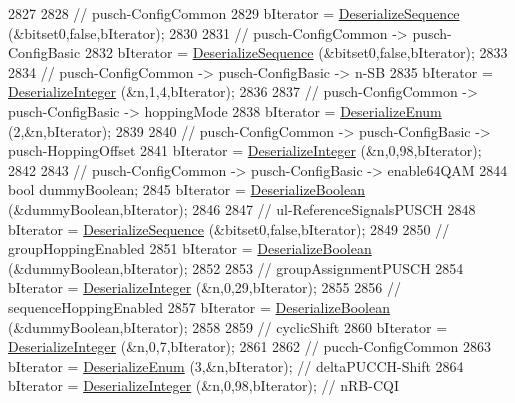 \begin{DoxyCode}
2827 
2828   \textcolor{comment}{// pusch-ConfigCommon}
2829   bIterator = \hyperlink{classns3_1_1Asn1Header_a58c68bb97ba3fe2e8fcdd7c208d672b2}{DeserializeSequence} (&bitset0,\textcolor{keyword}{false},bIterator);
2830 
2831   \textcolor{comment}{// pusch-ConfigCommon -> pusch-ConfigBasic}
2832   bIterator = \hyperlink{classns3_1_1Asn1Header_a58c68bb97ba3fe2e8fcdd7c208d672b2}{DeserializeSequence} (&bitset0,\textcolor{keyword}{false},bIterator);
2833 
2834   \textcolor{comment}{// pusch-ConfigCommon -> pusch-ConfigBasic -> n-SB}
2835   bIterator = \hyperlink{classns3_1_1Asn1Header_a49802c9af30018b078150e866b6ecae2}{DeserializeInteger} (&n,1,4,bIterator);
2836 
2837   \textcolor{comment}{// pusch-ConfigCommon -> pusch-ConfigBasic -> hoppingMode}
2838   bIterator = \hyperlink{classns3_1_1Asn1Header_a4fcc253e0eec3483c775b005c1875f2d}{DeserializeEnum} (2,&n,bIterator);
2839 
2840   \textcolor{comment}{// pusch-ConfigCommon -> pusch-ConfigBasic -> pusch-HoppingOffset}
2841   bIterator = \hyperlink{classns3_1_1Asn1Header_a49802c9af30018b078150e866b6ecae2}{DeserializeInteger} (&n,0,98,bIterator);
2842 
2843   \textcolor{comment}{// pusch-ConfigCommon -> pusch-ConfigBasic -> enable64QAM}
2844   \textcolor{keywordtype}{bool} dummyBoolean;
2845   bIterator = \hyperlink{classns3_1_1Asn1Header_ab46f4b86988a0fbeb5df11a9bc46222d}{DeserializeBoolean} (&dummyBoolean,bIterator);
2846 
2847   \textcolor{comment}{// ul-ReferenceSignalsPUSCH }
2848   bIterator = \hyperlink{classns3_1_1Asn1Header_a58c68bb97ba3fe2e8fcdd7c208d672b2}{DeserializeSequence} (&bitset0,\textcolor{keyword}{false},bIterator);
2849 
2850   \textcolor{comment}{// groupHoppingEnabled }
2851   bIterator = \hyperlink{classns3_1_1Asn1Header_ab46f4b86988a0fbeb5df11a9bc46222d}{DeserializeBoolean} (&dummyBoolean,bIterator);
2852 
2853   \textcolor{comment}{// groupAssignmentPUSCH }
2854   bIterator = \hyperlink{classns3_1_1Asn1Header_a49802c9af30018b078150e866b6ecae2}{DeserializeInteger} (&n,0,29,bIterator);
2855 
2856   \textcolor{comment}{// sequenceHoppingEnabled }
2857   bIterator = \hyperlink{classns3_1_1Asn1Header_ab46f4b86988a0fbeb5df11a9bc46222d}{DeserializeBoolean} (&dummyBoolean,bIterator);
2858 
2859   \textcolor{comment}{// cyclicShift }
2860   bIterator = \hyperlink{classns3_1_1Asn1Header_a49802c9af30018b078150e866b6ecae2}{DeserializeInteger} (&n,0,7,bIterator);
2861 
2862   \textcolor{comment}{// pucch-ConfigCommon }
2863   bIterator = \hyperlink{classns3_1_1Asn1Header_a4fcc253e0eec3483c775b005c1875f2d}{DeserializeEnum} (3,&n,bIterator); \textcolor{comment}{// deltaPUCCH-Shift }
2864   bIterator = \hyperlink{classns3_1_1Asn1Header_a49802c9af30018b078150e866b6ecae2}{DeserializeInteger} (&n,0,98,bIterator); \textcolor{comment}{// nRB-CQI }

\end{DoxyCode}
